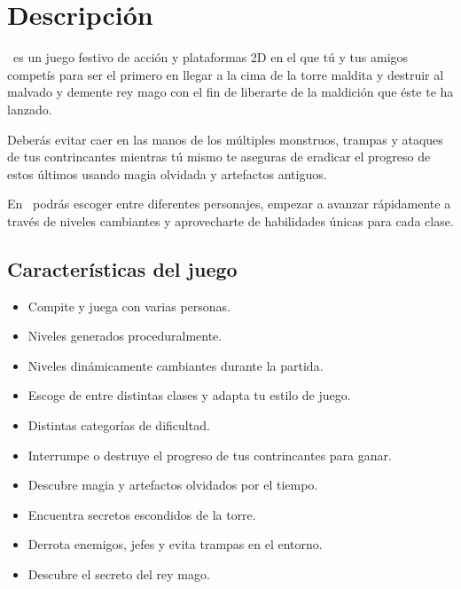 \justifying
\thispagestyle{fancy}
\fancyhf{}
\renewcommand{\headrulewidth}{0.5pt}
\fancyhead[R]{\small\slshape\thepage}
\frenchspacing
{}

\setlength{\parindent}{0cm} %
\setlength{\parskip}{1.5ex plus 0.5ex minus 0.5ex}   %

\setlength\headheight{15pt}
\section{Descripción}

\emph{\izenburua}\ es un juego festivo de acción y plataformas 2D en el que tú y
tus amigos competís para ser el primero en llegar a la cima de la torre maldita
y destruir al malvado y demente rey mago con el fin de liberarte de la maldición
que éste te ha lanzado.

Deberás evitar caer en las manos de los múltiples monstruos, trampas y ataques
de tus contrincantes mientras tú mismo te aseguras de eradicar el progreso de
estos últimos usando magia olvidada y artefactos antiguos.

En \emph{\izenburua}\ podrás escoger entre diferentes personajes, empezar a
avanzar rápidamente a través de niveles cambiantes y aprovecharte de habilidades
únicas para cada clase.

\subsection{Características del juego}

\begin{itemize}
    \item Compite y juega con varias personas.
    \item Niveles generados proceduralmente.
    \item Niveles dinámicamente cambiantes durante la partida.
    \item Escoge de entre distintas clases y adapta tu estilo de juego.
    \item Distintas categorías de dificultad.
    \item Interrumpe o destruye el progreso de tus contrincantes para ganar.
    \item Descubre magia y artefactos olvidados por el tiempo.
    \item Encuentra secretos escondidos de la torre.
    \item Derrota enemigos, jefes y evita trampas en el entorno.
    \item Descubre el secreto del rey mago.
\end{itemize}

